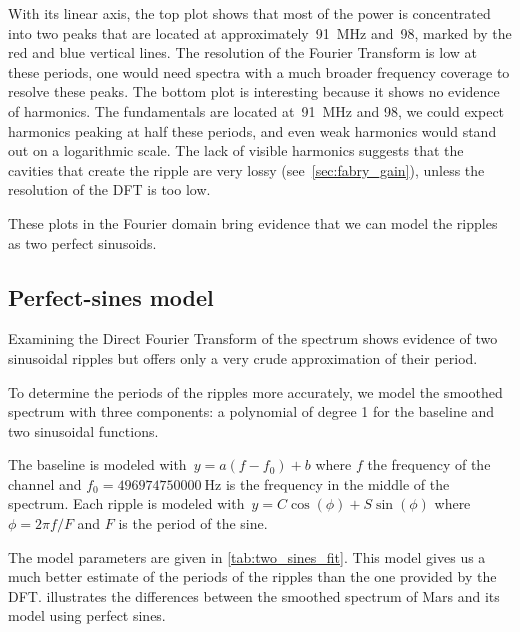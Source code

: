 \begin{refsection}
With its linear axis, the top plot shows that most of the power is concentrated into two peaks that are located at approximately~\SI{91}{\mega\hertz} and~\SI{98}{\megahertz}, marked by the red and blue vertical lines.
The resolution of the Fourier Transform is low at these periods, one would need spectra with a much broader frequency coverage to resolve these peaks.
The bottom plot is interesting because it shows no evidence of harmonics.
The fundamentals are located at~\SI{91}{\mega\hertz} and \SI{98}{\megahertz}, we could expect harmonics peaking at half these periods, and even weak harmonics would stand out on a logarithmic scale.
The lack of visible harmonics suggests that the cavities that create the ripple are very lossy (see~\cref{sec:fabry_gain}), unless the resolution of the DFT is too low.

These plots in the Fourier domain bring evidence that we can model the ripples as two perfect sinusoids.




\subsection{Perfect-sines model}
\label{sec:perfect_sines_model}
Examining the Direct Fourier Transform of the spectrum shows evidence of two sinusoidal ripples but offers only a very crude approximation of their period.

To determine the periods of the ripples more accurately, we model the smoothed spectrum with three components: a polynomial of degree 1 for the baseline and two sinusoidal functions.

The baseline is modeled with~$y=a(f-f_0)+b$ where
$f$ the frequency of the channel and
$f_0=\SI{496974750000}{\hertz}$ is the frequency in the middle of the spectrum.
Each ripple is modeled with~$y = C \cos(\phi) + S \sin(\phi)$ where
$\phi = 2 \pi f / F$ and $F$ is the period of the sine.

The model parameters are given in \cref{tab:two_sines_fit}.
This model gives us a much better estimate of the periods of the ripples than the one provided by the DFT.
 illustrates the differences between the smoothed spectrum of Mars and its model using perfect sines.



\end{refsection}
